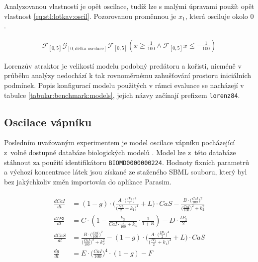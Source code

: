 Analyzovanou vlastností je opět oscilace, tudíž lze s malými úpravami použít opět
vlastnost \ref{eq:stl:lotkav:oscil}. Pozorovanou proměnnou je $x_1$, která
osciluje okolo $0$. 

\begin{align}
\label{eq:model:stl:lorenz84}
\mathcal{F}_{[0, 5]}\mathcal{G}_{[0, \textrm{délka oscilace}]}\mathcal{F}_{[0, 5]}(x \geq \frac{1}{100} \wedge \mathcal{F}_{[0, 5]}x \leq -\frac{1}{100})
\end{align}

Lorenzův atraktor je velikostí modelu podobný predátoru a kořisti, nic\-mé\-ně v průběhu
analýzy nedochází k tak rovnoměrnému zahušťování prostoru iniciálních podmínek.
Popis konfigurací modelu použitých v rámci evaluace  se nacházejí v tabulce \ref{tabular:benchmark:models},
jejich názvy začínají prefixem \texttt{lorenz84}.

\subsection{Oscilace vápníku}

Posledním uvažovaným experimentem je model oscilace vápníku \cite{meyer1991} po\-chá\-ze\-jí\-cí z~volně dostupné databáze biologických modelů \cite{biomodels}.
Model lze z~této databáze stáhnout za použití identifikátoru \texttt{BIOMD0000000224}.
Hodnoty fix\-ních parametrů a výchozí koncentrace látek jsou získané ze sta\-že\-né\-ho SBML souboru,
který byl bez jakýchkoliv změn importován do aplikace Parasim.

\begin{align}\label{eq:model:ode:lorenz84}
\begin{array}{ll}
\frac{dCaI}{dt} &= (1 - g) \cdot \bigg(\frac{A \cdot \big(\frac{IP_3}{2}\big)^4}{\big(\frac{IP_3}{2} + k_1\big)^4} + L\bigg) \cdot CaS - \frac{B \cdot \big(\frac{CaI}{100}\big) ^ 2}{\big(\frac{CaI}{100}\big) ^ 2 + k_2 ^ 2}\\
\frac{dIP3}{dt} &= C \cdot (1 - \frac{k_3}{CaI \cdot \frac{1}{100} + k_3} \cdot \frac{1}{1 + R} ) - D \cdot \frac{IP_3}{2}	\\
\frac{dCaS}{dt} &= \frac{B \cdot \big(\frac{CaI}{100}\big) ^ 2}{\big(\frac{CaI}{100}\big) ^ 2 + k_2 ^ 2} - (1 - g) \cdot \bigg(\frac{A \cdot \big(\frac{IP_3}{2}\big)^4}{\big(\frac{IP_3}{2} + k_1\big)^4} + L\bigg) \cdot CaS	\\
\frac{dg}{dt}   &= E \cdot \big(\frac{CaI}{100}\big) ^ 4 \cdot (1 - g) - F
\end{array}
\end{align}


